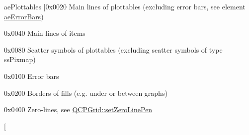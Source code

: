 \begin{Desc}
\begin{description}
{ae\+Plottables\hypertarget{namespace_q_c_p_ae55dbe315d41fe80f29ba88100843a0ca4145e4251b0cf2dbedabeea0a38f84f6}{}\label{namespace_q_c_p_ae55dbe315d41fe80f29ba88100843a0ca4145e4251b0cf2dbedabeea0a38f84f6}
}]{\ttfamily 0x0020} Main lines of plottables (excluding error bars, see element \hyperlink{namespace_q_c_p_ae55dbe315d41fe80f29ba88100843a0ca9dcf3882cb321bb305f71fdc0f09f63d}{ae\+Error\+Bars}) \item[{\em 
ae\+Items\hypertarget{namespace_q_c_p_ae55dbe315d41fe80f29ba88100843a0caf7712a85d6b0c75b24301d2fe9484db3}{}\label{namespace_q_c_p_ae55dbe315d41fe80f29ba88100843a0caf7712a85d6b0c75b24301d2fe9484db3}
}]{\ttfamily 0x0040} Main lines of items \item[{\em 
ae\+Scatters\hypertarget{namespace_q_c_p_ae55dbe315d41fe80f29ba88100843a0cae45ed8cd167bffe27d7f40da4bc17e9c}{}\label{namespace_q_c_p_ae55dbe315d41fe80f29ba88100843a0cae45ed8cd167bffe27d7f40da4bc17e9c}
}]{\ttfamily 0x0080} Scatter symbols of plottables (excluding scatter symbols of type ss\+Pixmap) \item[{\em 
ae\+Error\+Bars\hypertarget{namespace_q_c_p_ae55dbe315d41fe80f29ba88100843a0ca9dcf3882cb321bb305f71fdc0f09f63d}{}\label{namespace_q_c_p_ae55dbe315d41fe80f29ba88100843a0ca9dcf3882cb321bb305f71fdc0f09f63d}
}]{\ttfamily 0x0100} Error bars \item[{\em 
ae\+Fills\hypertarget{namespace_q_c_p_ae55dbe315d41fe80f29ba88100843a0ca788810f0aa930137de6ad6cc6d83d354}{}\label{namespace_q_c_p_ae55dbe315d41fe80f29ba88100843a0ca788810f0aa930137de6ad6cc6d83d354}
}]{\ttfamily 0x0200} Borders of fills (e.\+g. under or between graphs) \item[{\em 
ae\+Zero\+Line\hypertarget{namespace_q_c_p_ae55dbe315d41fe80f29ba88100843a0ca261f8ea78cf3c9561726223ffa33dc12}{}\label{namespace_q_c_p_ae55dbe315d41fe80f29ba88100843a0ca261f8ea78cf3c9561726223ffa33dc12}
}]{\ttfamily 0x0400} Zero-\/lines, see \hyperlink{class_q_c_p_grid_a209f40fdb252397b418b82d3494d8ea0}{Q\+C\+P\+Grid\+::set\+Zero\+Line\+Pen} \item[{\em 
}
\end{description}
\end{Desc}
